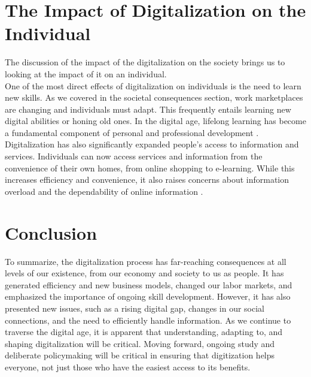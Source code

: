 \documentclass[12pt]{article}
\begin{document}
\section{The Impact of Digitalization on the Individual}
The discussion of the impact of the digitalization on the society brings us to looking at the impact of it on an individual. \\
One of the most direct effects of digitalization on individuals is the need to learn new skills. As we covered in the societal consequences section, work marketplaces are changing and individuals must adapt. This frequently entails learning new digital abilities or honing old ones. In the digital age, lifelong learning has become a fundamental component of personal and professional development \cite{Cendon.2018}. \\
Digitalization has also significantly expanded people's access to information and services. Individuals can now access services and information from the convenience of their own homes, from online shopping to e-learning. While this increases efficiency and convenience, it also raises concerns about information overload and the dependability of online information \cite{Zheng.2023}.

\section{Conclusion}
To summarize, the digitalization process has far-reaching consequences at all levels of our existence, from our economy and society to us as people. It has generated efficiency and new business models, changed our labor markets, and emphasized the importance of ongoing skill development. However, it has also presented new issues, such as a rising digital gap, changes in our social connections, and the need to efficiently handle information. As we continue to traverse the digital age, it is apparent that understanding, adapting to, and shaping digitalization will be critical. Moving forward, ongoing study and deliberate policymaking will be critical in ensuring that digitization helps everyone, not just those who have the easiest access to its benefits.

\newpage

\end{document}
